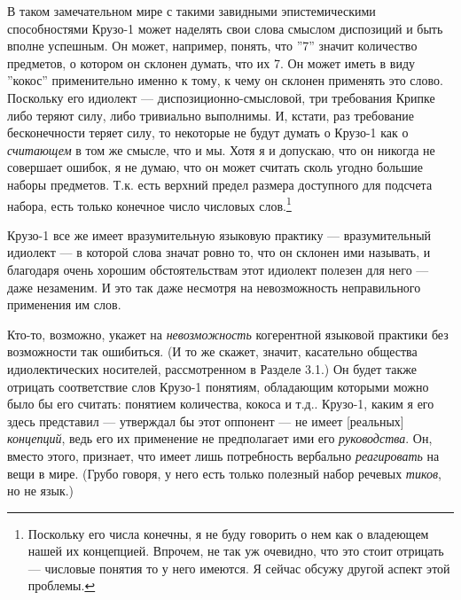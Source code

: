 \documentclass[11pt]{book}
\begin{document}
В таком замечательном мире с такими завидными эпистемическими способностями Крузо-1 может наделять свои слова смыслом диспозиций и быть вполне успешным. Он может, например, понять, что ''7'' значит количество предметов, о котором он склонен думать, что их 7. Он может иметь в виду ''кокос'' применительно именно к тому, к чему он склонен применять это слово. Поскольку его идиолект --- диспозиционно-смысловой, три требования Крипке либо теряют силу, либо тривиально выполнимы. И, кстати, раз требование бесконечности теряет силу, то некоторые не будут думать о Крузо-1 как о \textit{считающем} в том же смысле, что и мы. Хотя я и допускаю, что он никогда не совершает ошибок, я не думаю, что он может считать сколь угодно большие наборы предметов. Т.к. есть верхний предел размера доступного для подсчета набора, есть только конечное число числовых слов.\footnote{Поскольку его числа конечны, я не буду говорить о нем как о владеющем нашей их концепцией. Впрочем, не так уж очевидно, что это стоит отрицать --- числовые понятия то у него имеются. Я сейчас обсужу другой аспект этой проблемы.}


Крузо-1 все же имеет вразумительную языковую практику --- вразумительный идиолект --- в которой слова значат ровно то, что он склонен ими называть, и благодаря очень хорошим обстоятельствам этот идиолект полезен для него --- даже незаменим. И это так даже несмотря на невозможность неправильного применения им слов.

Кто-то, возможно, укажет на \textit{невозможность} когерентной языковой практики без возможности так ошибиться. (И то же скажет, значит, касательно общества идиолектических носителей, рассмотренном в Разделе 3.1.) Он будет также отрицать соответствие слов Крузо-1 понятиям, обладающим которыми можно было бы его считать: понятием количества, кокоса и т.д.. Крузо-1, каким я его здесь представил --- утверждал бы этот оппонент --- не имеет [реальных] \textit{концепций}, ведь его их применение не предполагает ими его \textit{руководства}. Он, вместо этого, признает, что имеет лишь потребность вербально \textit{реагировать} на вещи в мире. (Грубо говоря, у него есть только полезный набор речевых \textit{тиков}, но не язык.)
\end{document}

